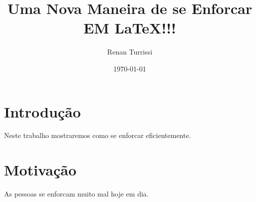 \documentclass{article}
\author{Renan Turrissi}
\date{\today}
\title{Uma Nova Maneira de se Enforcar EM \LaTeX !!!}
\begin{document}
\maketitle

\newpage

\section{Introdução}
Neste trabalho mostraremos como se enforcar eficientemente.

\section{Motivação}
As pessoas se enforcam muito mal hoje em dia.
\end{document}

